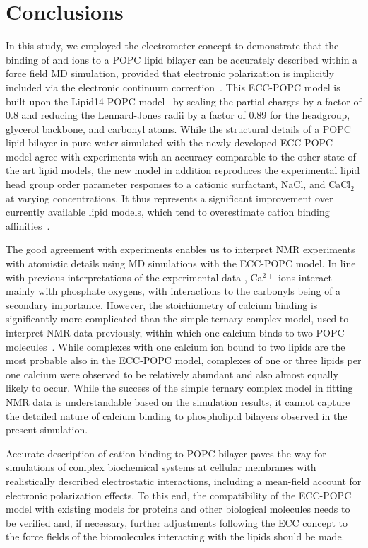 \documentclass[journal=jpcbfk,manuscript=article]{achemso}
\begin{document}
\section{Conclusions}

In this study, we employed the electrometer concept to demonstrate that the binding of  and  ions to a POPC lipid bilayer can be accurately described within a force field MD simulation, provided that electronic polarization is implicitly included via the electronic continuum correction~\cite{leontyev11}. This ECC-POPC model is built upon the Lipid14 POPC model~\cite{dickson14} by scaling the partial charges by a factor of 0.8 and reducing the Lennard-Jones radii by a factor of 0.89 for the headgroup, glycerol backbone, and carbonyl atoms. While the structural details of a POPC lipid bilayer in pure water simulated with the newly developed ECC-POPC model agree with experiments with an accuracy comparable to the other state of the art lipid models, the new model in addition reproduces the experimental lipid head group order parameter responses to a cationic surfactant, NaCl, and CaCl$_2$ at varying concentrations. It thus represents a significant improvement over currently available lipid models, which tend to overestimate cation binding affinities~\cite{catte16}. 

The good agreement with experiments enables us to interpret NMR experiments with atomistic details using MD simulations with the ECC-POPC model. In line with previous interpretations of the experimental data \cite{hauser76,hauser78,herbette84,binder02}, Ca$^{2+}$ ions interact mainly with phosphate oxygens, with interactions to the carbonyls being of a secondary importance. However, the stoichiometry of calcium binding is significantly more complicated than the simple ternary complex model, used to interpret NMR data previously, within which one calcium binds to two POPC molecules~\cite{altenbach84}. While complexes with one calcium ion bound to two lipids are the most probable also in the ECC-POPC model, complexes of one or three lipids per one calcium were observed to be relatively abundant and also almost equally likely to occur. While the success of the simple ternary complex model in fitting NMR data is understandable based on the simulation results, it cannot capture the detailed nature of calcium binding to phospholipid bilayers observed in the present simulation.

Accurate description of cation binding to POPC bilayer paves the way for simulations of complex biochemical systems at cellular membranes with realistically described electrostatic interactions, including a mean-field account for electronic polarization effects. To this end, the compatibility of the ECC-POPC model with existing models for proteins and other biological molecules needs to be verified and, if necessary, further adjustments following the ECC concept to the force fields of the biomolecules interacting with the lipids should be made.
\end{document}
